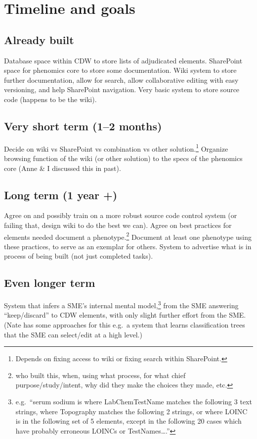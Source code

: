 \documentclass{tufte-handout}
\begin{document}
\section{Timeline and goals}

\subsection{Already built}

Database space within CDW to store lists of adjudicated elements.
SharePoint space for phenomics core to store some documentation. Wiki
system to store further documentation, allow for search, allow
collaborative editing with easy versioning, and help SharePoint
navigation. Very basic system to store source code (happens to be the
wiki).

\subsection{Very short term (1--2 months)}

Decide on wiki vs SharePoint vs combination vs other solution.\footnote{Depends
on fixing access to wiki or fixing search within SharePoint.} Organize
browsing function of the wiki (or other solution) to the specs of the
phenomics core (Anne \& I discussed this in past).

\subsection{Long term (1 year +)}

Agree on and possibly train on a more robust source code control
system (or failing that, design wiki to do the best we can). Agree on
best practices for elements needed document a phenotype.\footnote{who built
this, when, using what process, for what chief purpose/study/intent,
why did they make the choices they made, etc.} Document at least one
phenotype using these practices, to serve as an exemplar for others.
System to advertise what is in process of being built (not just
completed tasks).

\subsection{Even longer term}

System that infers a SME's internal mental model,\footnote{e.g.\ ``serum sodium
is where LabChemTestName matches the following 3 text strings, where
Topography matches the following 2 strings, or where LOINC is in the
following set of 5 elements, except in the following 20 cases which
have probably erroneous LOINCs or TestNames\ldots{}.''} from the SME
answering ``keep/discard'' to CDW elements, with only slight further
effort from the SME. (Nate has some approaches for this e.g.\ a system
that learns classification trees that the SME can select/edit at a
high level.)
\end{document}
